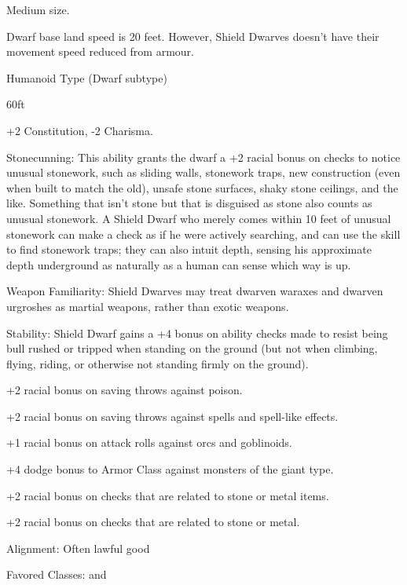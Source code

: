 \begin{multicols}{2}

\begin{itemize*}
\item Medium size.
\item Dwarf base land speed is 20 feet. However, Shield Dwarves doesn't have their movement speed reduced from armour.
\item Humanoid Type (Dwarf subtype)
\item {} 60ft
\item +2 Constitution, -2 Charisma.
\item Stonecunning: This ability grants the dwarf a +2 racial bonus on  checks to notice unusual stonework, such as sliding walls, stonework traps, new construction (even when built to match the old), unsafe stone surfaces, shaky stone ceilings, and the like. Something that isn't stone but that is disguised as stone also counts as unusual stonework. A Shield Dwarf who merely comes within 10 feet of unusual stonework can make a  check as if he were actively searching, and can use the  skill to find stonework traps; they can also intuit depth, sensing his approximate depth underground as naturally as a human can sense which way is up.
\item Weapon Familiarity: Shield Dwarves may treat dwarven waraxes and dwarven urgroshes as martial weapons, rather than exotic weapons.
\item Stability: Shield Dwarf gains a +4 bonus on ability checks made to resist being bull rushed or tripped when standing on the ground (but not when climbing, flying, riding, or otherwise not standing firmly on the ground).
\item +2 racial bonus on saving throws against poison.
\item +2 racial bonus on saving throws against spells and spell-like effects.
\item +1 racial bonus on attack rolls against orcs and goblinoids.
\item +4 dodge bonus to Armor Class against monsters of the giant type.
\item +2 racial bonus on  checks that are related to stone or metal items.
\item +2 racial bonus on  checks that are related to stone or metal.
\item Alignment: Often lawful good
\item Favored Classes:  and 
\end{itemize*}


\end{multicols}
